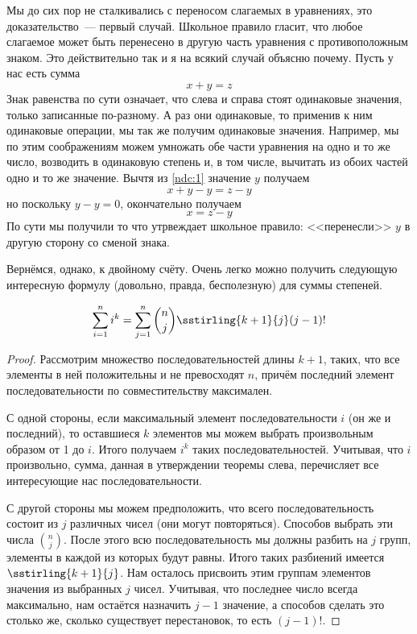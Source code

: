 Мы до сих пор не сталкивались с переносом слагаемых в уравнениях, это доказательство~--- первый случай. Школьное правило гласит, что любое слагаемое может быть перенесено в другую часть уравнения с противоположным знаком. Это действительно так и я на всякий случай объясню почему. Пусть у нас есть сумма
\begin{equation}\label{ndc:1}
x+y = z
\end{equation}
Знак равенства по сути означает, что слева и справа стоят одинаковые значения, только записанные по-разному. А раз они одинаковые, то применив к ним одинаковые операции, мы так же получим одинаковые значения. Например, мы по этим соображениям можем умножать обе части уравнения на одно и то же число, возводить в одинаковую степень и, в том числе, вычитать из обоих частей одно и то же значение. Вычтя из \eqref{ndc:1} значение $y$ получаем
$$x + y - y = z - y$$
но поскольку $y-y=0$, окончательно получаем
$$x = z - y$$
По сути мы получили то что утрвеждает школьное правило: <<перенесли>> $y$ в другую сторону со сменой знака.

Вернёмся, однако, к двойному счёту. Очень легко можно получить следующую интересную формулу (довольно, правда, бесполезную) для суммы степеней.

\begin{thm}
$$\sum_{i=1}^n i^k = \sum_{j=1}^n {n \choose j}\sstirling{k+1}{j}(j-1)!$$
\end{thm}
\begin{proof}
Рассмотрим множество последовательностей длины $k+1$, таких, что все элементы в ней положительны и не превосходят $n$, причём последний элемент последовательности по совместительству максимален.

С одной стороны, если максимальный элемент последовательности $i$ (он же и последний), то оставшиеся $k$ элементов мы можем выбрать произвольным образом от 1 до $i$. Итого получаем $i^k$ таких последовательностей. Учитывая, что $i$ произвольно, сумма, данная в утверждении теоремы слева, перечисляет все интересующие нас последовательности.

С другой стороны мы можем предположить, что всего последовательность состоит из $j$ различных чисел (они могут повторяться). Способов выбрать эти числа $n\choose j$. После этого всю последовательность мы должны разбить на $j$ групп, элементы в каждой из которых будут равны. Итого таких разбиений имеется $\sstirling{k+1}{j}$. Нам осталось присвоить этим группам элементов значения из выбранных $j$ чисел. Учитывая, что последнее число всегда максимально, нам остаётся назначить $j-1$ значение, а способов сделать это столько же, сколько существует перестановок, то есть $(j-1)!$.
\end{proof}

